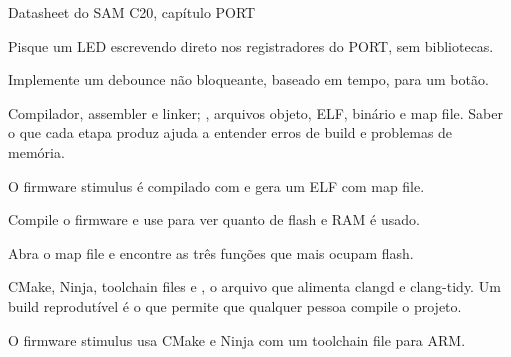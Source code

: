 \begin{paraestudar}
  \item {}
  \item Datasheet do SAM C20, capítulo PORT
\end{paraestudar}

\begin{pratique}
  \item Pisque um LED escrevendo direto nos registradores do PORT, sem bibliotecas.
  \item Implemente um debounce não bloqueante, baseado em tempo, para um botão.
\end{pratique}

Compilador, assembler e linker; , arquivos objeto, ELF, binário e map file. Saber o que cada etapa produz ajuda a entender erros de build e problemas de memória.

\begin{noproduto}
O firmware stimulus é compilado com  e gera um ELF com map file.
\end{noproduto}

\begin{paraestudar}
  \item {}
\end{paraestudar}

\begin{pratique}
  \item Compile o firmware e use  para ver quanto de flash e RAM é usado.
  \item Abra o map file e encontre as três funções que mais ocupam flash.
\end{pratique}

CMake, Ninja, toolchain files e , o arquivo que alimenta clangd e clang-tidy. Um build reprodutível é o que permite que qualquer pessoa compile o projeto.

\begin{noproduto}
O firmware stimulus usa CMake e Ninja com um toolchain file para ARM.
\end{noproduto}

\begin{paraestudar}
  \item {}
\end{paraestudar}

